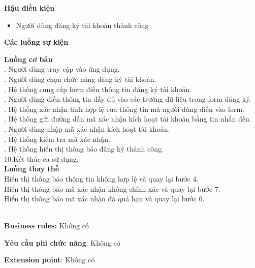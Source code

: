 \textbf{Hậu điều kiện}
\begin{itemize}
    \item Người dùng đăng ký tài khoản thành công
\end{itemize}

\textbf{Các luồng sự kiện}

\begin{small}
\textbf{Luồng cơ bản}\\
. Người dùng truy cập vào ứng dụng.\\
. Người dùng chọn chức năng đăng ký tài khoản.\\
. Hệ thống cung cấp form điền thông tin đăng ký tài khoản.\\
. Người dùng điền thông tin đầy đủ vào các trường dữ liệu trong form đăng ký.\\
. Hệ thống xác nhận tính hợp lệ của thông tin mà người dùng điền vào form.\\
. Hệ thống gửi đường dẫn mã xác nhận kích hoạt tài khoản bằng tin nhắn đến.\\
. Người dùng nhập mã xác nhận kích hoạt tài khoản.\\
. Hệ thống kiểm tra mã xác nhận.\\
. Hệ thống hiển thị thông báo đăng ký thành công.\\
\indent 10.Kết thúc ca sử dụng.\\

\textbf{Luồng thay thế}\\
 Hiển thị thông báo thông tin không hợp lệ và quay lại bước 4.\\
 Hiển thị thông báo mã xác nhận không chính xác và quay lại bước 7.\\
 Hiển thị thông báo mã xác nhận đã quá hạn và quay lại bước 6.\\
\end{small}\\
\textbf{\indent Business rules:} Không có

\textbf{Yêu cầu phi chức năng}: Không có

\textbf{Extension point}: Không có


